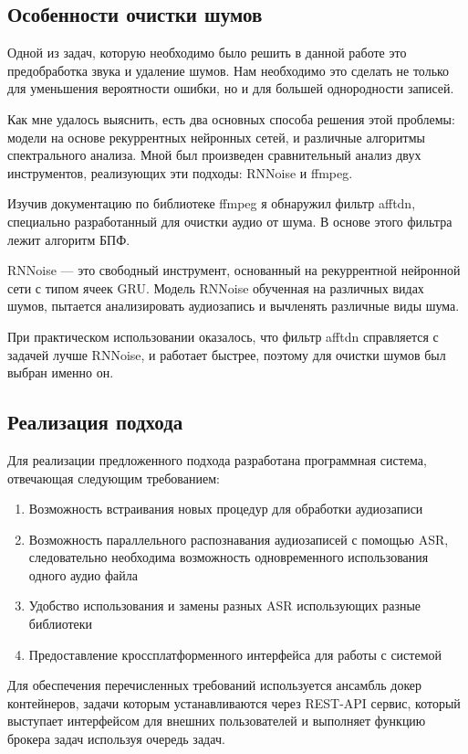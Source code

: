 \documentclass[conference]{IEEEtran}
\begin{document}
\subsection{Особенности очистки шумов}
Одной из задач, которую необходимо было решить в данной работе это предобработка звука и удаление шумов. Нам необходимо это сделать не только для уменьшения вероятности ошибки, но и для большей однородности записей.

Как мне удалось выяснить, есть два основных способа решения этой проблемы: модели на основе рекуррентных нейронных сетей, и различные алгоритмы спектрального анализа.
Мной был произведен сравнительный анализ двух инструментов, реализующих эти подходы: RNNoise и ffmpeg.

Изучив документацию по библиотеке ffmpeg я обнаружил фильтр afftdn, специально разработанный для очистки аудио от шума. В основе этого фильтра лежит алгоритм БПФ.

RNNoise — это свободный инструмент, основанный на рекуррентной нейронной сети с типом ячеек GRU. Модель RNNoise обученная на различных видах шумов, пытается анализировать аудиозапись и вычленять различные виды шума.

При практическом использовании оказалось, что фильтр afftdn справляется с задачей лучше RNNoise, и работает быстрее, поэтому для очистки шумов был выбран именно он.

\subsection{Реализация подхода}

Для реализации предложенного подхода разработана программная система, отвечающая следующим требованием:

\begin{enumerate}
\item Возможность встраивания новых процедур для обработки аудиозаписи
\item Возможность параллельного распознавания аудиозаписей с помощью ASR, следовательно необходима возможность одновременного использования одного аудио файла
\item Удобство использования и замены разных ASR использующих разные библиотеки
\item Предоставление кроссплатформенного интерфейса для работы с системой
\end{enumerate}

Для обеспечения перечисленных требований используется ансамбль докер контейнеров, задачи которым устанавливаются через REST-API сервис,
который выступает интерфейсом для внешних пользователей и выполняет функцию брокера задач используя очередь задач.
\end{document}

